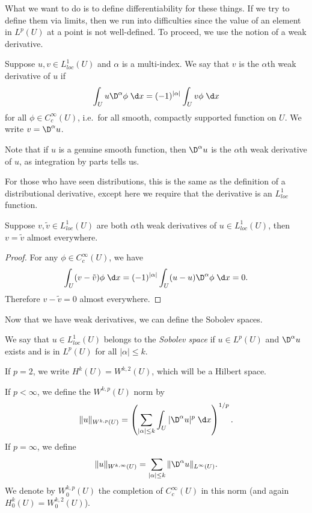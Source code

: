 \documentclass[a4paper]{article}
\begin{document}
What we want to do is to define differentiability for these things. If we try to define them via limits, then we run into difficulties since the value of an element in $L^p(U)$ at a point is not well-defined. To proceed, we use the notion of a weak derivative.

\begin{defi}
  Suppose $u, v \in L^1_{loc}(U)$ and $\alpha$ is a multi-index. We say that $v$ is the $\alpha$th weak derivative of $u$ if
  \[
    \int_U u \D^\alpha \phi \;\d x = (-1)^{|\alpha|} \int_U v \phi\;\d x
  \]
  for all $\phi \in C^\infty_c(U)$, i.e.\ for all smooth, compactly supported function on $U$. We write $v = \D^\alpha u$.
\end{defi}

Note that if $u$ is a genuine smooth function, then $\D^\alpha u$ is the $\alpha$th weak derivative of $u$, as integration by parts tells us.

For those who have seen distributions, this is the same as the definition of a distributional derivative, except here we require that the derivative is an $L^1_{loc}$ function.

\begin{lemma}
  Suppose $v, \tilde{v} \in L^1_{loc}(U)$ are both $\alpha$th weak derivatives of $u \in L^1_{loc}(U)$, then $v = \tilde{v}$ almost everywhere.
\end{lemma}

\begin{proof}
  For any $\phi \in C^\infty_c(U)$, we have
  \[
    \int_U (v - \tilde{v}) \phi \;\d x = (-1)^{|\alpha|}\int_U (u - u) \D^\alpha \phi\;\d x = 0.
  \]
  Therefore $v - \tilde{v} = 0$ almost everywhere.
\end{proof}

Now that we have weak derivatives, we can define the Sobolev spaces.

\begin{defi}
  We say that $u \in L^1_{loc}(U)$ belongs to the \emph{Sobolev space}  if $u \in L^p(U)$ and $\D^\alpha u$ exists and is in $L^p(U)$ for all $|\alpha| \leq k$.

  If $p = 2$, we write $H^k(U) = W^{k, 2}(U)$, which will be a Hilbert space.

  If $p < \infty$, we define the $W^{k, p}(U)$ norm by
  \[
    \|u\|_{W^{k, p}(U)} = \left(\sum_{|\alpha| \leq k}\int_U |\D^\alpha u|^p \;\d x \right)^{1/p}.
  \]
  If $p = \infty$, we define
  \[
    \|u\|_{W^{k, \infty}(U)} = \sum_{|\alpha|\leq k} \|\D^\alpha u\|_{L^\infty(U)}.
  \]
  We denote by $W_0^{k, p}(U)$ the completion of $C_c^\infty(U)$ in this norm (and again $H^k_0(U) = W^{k, 2}_0(U)$).
\end{defi}
\end{document}
